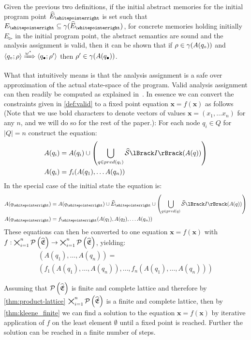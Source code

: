 Given the previous two definitions, if the initial abstract memories for the initial program point $\ab{E}_\whitepointerright$ is set such that $E_{\whitepointerright} \subseteq \concrete(\ab{E}_\whitepointerright)$, for concrete memories holding initially $E_{\whitepointerright}$ in the initial program point, the abstract semantics are sound and the analysis assignment is valid, then it can be shown that if $\rho \in \gamma(A(q_\circ))$ and $\langle q_\circ; \rho \rangle \xRightarrow{\omega^\star} \langle q_\bullet; \rho' \rangle$ then $\rho' \in \gamma(A(q_\bullet))$.

What that intuitively means is that the analysis assignment is a safe over approximation of the actual state-space of the program.
Valid analysis assignment can then readily be computed as explained in~\cite{nielson_formal_2019}.
In essence we can convert the constraints given in \autoref{def:valid} to a fixed point equation $\mathbf{x} = f(\mathbf{x})$ as follows (Note that we use bold characters to denote vectors of values $\mathbf{x} = (x_1, \dots x_n)$ for any $n$, and we will do so for the rest of the paper.):
For each node $q_i \in Q$ for $|Q| = n$ construct the equation:
\begin{align} \label{eq:q}
    A(q_i) &= A(q_i) \cup \left(\bigcup_{q \in pred(q_i)} \abssem{I}(A(q))\right) \\
    A(q_i) &= f_i(A(q_1), \dots A(q_n))
\end{align}
In the special case of the initial state the equation is:
\begin{align}
    A(q_\whitepointerright) &= A(q_\whitepointerright) \cup \ab{E}_\whitepointerright \cup  \left(\bigcup_{q \in pred(q)} \abssem{I}(A(q))\right) \\
    A(q_\whitepointerright) &= f_\whitepointerright(A(q_1), A(q_2), \dots A(q_n))
\end{align}
These equations can then be converted to one equation $\mathbf{x} = f(\mathbf{x})$ with $f : \bigtimes_{i = 1}^n \mathcal{P}\left(\widehat{\mathfrak{E}}\right) \rightarrow \bigtimes_{i = 1}^n \mathcal{P}\left(\widehat{\mathfrak{E}}\right)$, yielding:
\begin{multline}\label{eq:constraint}
    (A(q_1), \dots, A(q_n)) = \\
    (f_1(A(q_1), \dots, A(q_n)), \dots, f_n(A(q_1), \dots, A(q_n)))
\end{multline}

Assuming that $\mathcal{P}\left(\widehat{\mathfrak{E}}\right)$ is finite and complete lattice and therefore by \autoref{thm:product-lattice} $\bigtimes_{i = 1}^n \mathcal{P}\left(\widehat{\mathfrak{E}}\right)$ is a finite and complete lattice, then by \autoref{thm:kleene_finite} we can find a solution to the equation $\mathbf{x} = f(\mathbf{x})$ by iterative application of $f$ on the least element $\emptyset$ until a fixed point is reached.
Further the solution can be reached in a finite number of steps.
